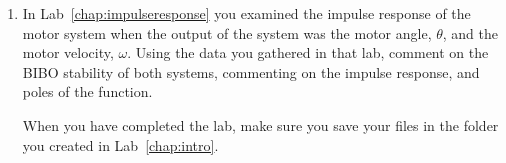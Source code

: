 \begin{enumerate}
\item In Lab~\ref{chap:impulseresponse} you examined the impulse response of
the motor system when the output of the system was the motor angle,
$\theta$\@, and the motor velocity, $\omega$\@.  Using the data you gathered
in that lab, comment on the BIBO stability of both systems, commenting on the
impulse response, and poles of the function.

When you have completed the lab, make sure you save your files in the folder
you created in Lab~\ref{chap:intro}\@.
\end{enumerate}

